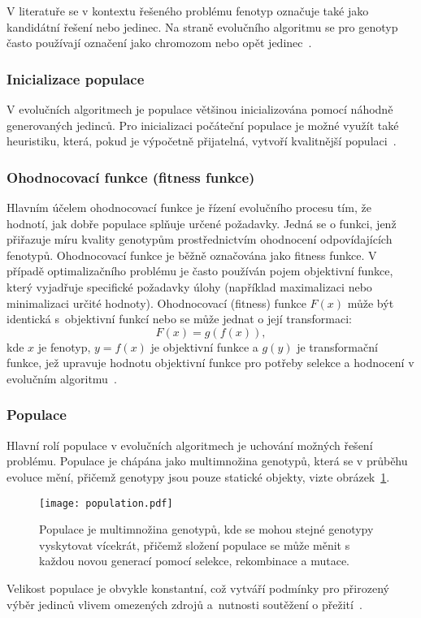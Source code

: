 V literatuře se v kontextu řešeného problému fenotyp označuje také jako kandidátní řešení nebo jedinec. 
Na straně evolučního algoritmu se pro genotyp často používají označení jako chromozom nebo opět jedinec~\cite{IntroductionToEvoComputing}.

\subsubsection*{Inicializace populace}
V evolučních algoritmech je populace většinou inicializována pomocí náhodně generovaných jedinců. 
Pro inicializaci počáteční populace je možné využít také heuristiku, která, pokud je výpočetně přijatelná, vytvoří kvalitnější populaci~\cite{IntroductionToEvoComputing}. 

\subsubsection*{Ohodnocovací funkce (fitness funkce)}
Hlavním účelem ohodnocovací funkce je řízení evolučního procesu tím, že hodnotí, jak dobře populace splňuje určené požadavky. 
Jedná se o funkci, jenž přiřazuje míru kvality genotypům prostřednictvím ohodnocení odpovídajících fenotypů. 
Ohodnocovací funkce je běžně označována jako fitness funkce. 
V případě optimalizačního problému je často používán pojem objektivní funkce, který vyjadřuje specifické požadavky úlohy (například maximalizaci nebo minimalizaci určité hodnoty).
Ohodnocovací (fitness) funkce $F\left(x\right)$ může být identická s~objektivní funkcí nebo se může jednat o její transformaci:
\begin{equation*}
    F\left( x \right) = g\left( f \left( x \right)\right),
\end{equation*}
kde $x$ je fenotyp, $y=f\left(x\right)$ je objektivní funkce a $g\left(y\right)$ je transformační funkce, jež upravuje hodnotu objektivní funkce pro potřeby selekce a hodnocení v evolučním algoritmu~\cite{IntroductionToEvoComputing,NaturalComputing}. 

\subsubsection*{Populace}
Hlavní rolí populace v evolučních algoritmech je uchování možných řešení problému. 
Populace je chápána jako multimnožina genotypů, která se v průběhu evoluce mění, přičemž genotypy jsou pouze statické objekty, vizte obrázek~\ref{fig:population}. 
\begin{figure}[ht!]
    \centering
    \texttt{[image: population.pdf]}
    \caption{Populace je multimnožina genotypů, kde se mohou stejné genotypy vyskytovat vícekrát, přičemž složení populace se může měnit s každou novou generací pomocí selekce, rekombinace a mutace.}
    \label{fig:population}
\end{figure}
Velikost populace je obvykle konstantní, což vytváří podmínky pro přirozený výběr jedinců vlivem omezených zdrojů a~nutnosti soutěžení o přežití~\cite{IntroductionToEvoComputing}. 

